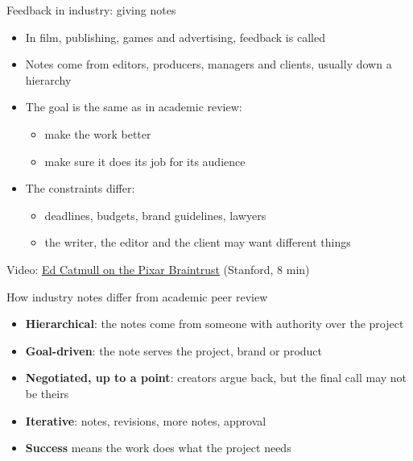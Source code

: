 \documentclass[aspectratio=169]{beamer}
\begin{document}
\begin{frame}{Feedback in industry: giving notes}
\begin{itemize}
  \item In film, publishing, games and advertising, feedback is called  \citep{catmull2014creativityinc}
  \item Notes come from editors, producers, managers and clients, usually down a hierarchy
  \item The goal is the same as in academic review:
    \begin{itemize}
      \item make the work better
      \item make sure it does its job for its audience
    \end{itemize}
  \item The constraints differ:
    \begin{itemize}
      \item deadlines, budgets, brand guidelines, lawyers
      \item the writer, the editor and the client may want different things
    \end{itemize}
\end{itemize}

\medskip
\small Video: \href{https://www.youtube.com/watch?v=I1Mr3oKR7oM}{Ed Catmull on the Pixar Braintrust} (Stanford, 8 min) %
\end{frame}

\begin{frame}{How industry notes differ from academic peer review}
\begin{itemize}
  \item \textbf{Hierarchical}: the notes come from someone with authority over the project
  \item \textbf{Goal-driven}: the note serves the project, brand or product
  \item \textbf{Negotiated, up to a point}: creators argue back, but the final call may not be theirs
  \item \textbf{Iterative}: notes, revisions, more notes, approval
  \item \textbf{Success} means the work does what the project needs
\end{itemize}

\end{frame}
\end{document}

